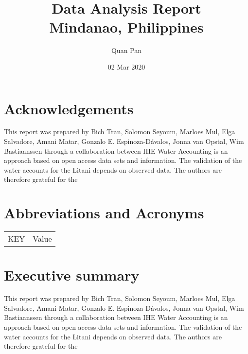 \documentclass{article}%
\title{Data Analysis Report\\Mindanao, Philippines}%
\author{Quan Pan}%
\date{02 Mar 2020}%
\begin{document}
%
\normalsize%
\pagestyle{CoverPage}%
\cleardoublepage%
\newpage%
\pagestyle{FirstPage}%
\cleardoublepage%
\newpage%
\pagestyle{TOCPage}%
\cleardoublepage%
\clearpage%
%
\setcounter{page}{1}%
\pagestyle{PreambleHeader}%
\newpage%
\listoffigures%
%
\cleardoublepage%
\newpage%
\listoftables%
%
\cleardoublepage%
\newpage%
\RaggedRight%
\section*{Acknowledgements}%
\label{sec:Acknowledgements}%
This report was prepared by Bich Tran, Solomon Seyoum, Marloes Mul, Elga Salvadore, Amani Matar, Gonzalo E. Espinoza{-}Dávalos, Jonna van Opstal, Wim Bastiaanssen through a collaboration between IHE%
\linebreak%
Water Accounting is an approach based on open access data sets and information. The validation of the water accounts for the Litani depends on observed data. The authors are therefore grateful for the%
\linebreak

%
%
\cleardoublepage%
\newpage%
\RaggedRight%
\section*{Abbreviations and Acronyms}%
\label{sec:AbbreviationsandAcronyms}%
\begin{longtabu}{X[l] X[l]}%
\endhead%
\endfoot%
\endlastfoot%
KEY&Value\\%
\end{longtabu}

%
%
\cleardoublepage%
\newpage%
\RaggedRight%
\section*{Executive summary}%
\label{sec:Executivesummary}%
This report was prepared by Bich Tran, Solomon Seyoum, Marloes Mul, Elga Salvadore, Amani Matar, Gonzalo E. Espinoza{-}Dávalos, Jonna van Opstal, Wim Bastiaanssen through a collaboration between IHE%
\linebreak%
Water Accounting is an approach based on open access data sets and information. The validation of the water accounts for the Litani depends on observed data. The authors are therefore grateful for the%
\linebreak
\end{document}

